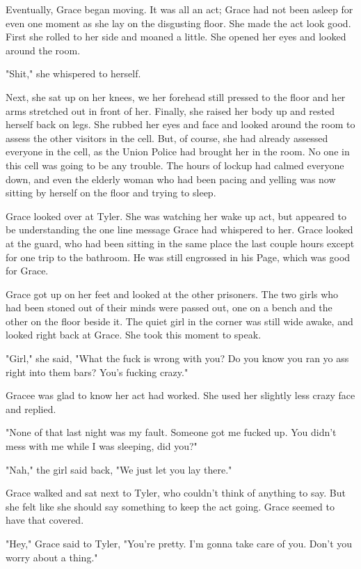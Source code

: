 \documentclass[courier]{sffms}
\begin{document}
Eventually, Grace began moving. It was all an act; Grace
had not been asleep for even one moment as she lay
on the disgusting floor. She made the act look good.
First she rolled to her side and moaned a little.
She opened her eyes and looked around the room.

"Shit," she whispered to herself.

Next, she sat up on her knees, we her forehead still pressed
to the floor and her arms stretched out in front of her.
Finally, she raised her body up and rested herself back on
legs. She rubbed her eyes and face and looked around the
room to assess the other visitors in the cell. But, of course,
she had already assessed everyone in the cell, as the Union
Police had brought her in the room. No one in this cell was
going to be any trouble. The hours of lockup had calmed
everyone down, and even the elderly woman who had been
pacing and yelling was now sitting by herself on the floor
and trying to sleep.

Grace looked over at Tyler. She was watching her wake up
act, but appeared to be understanding the one line message
Grace had whispered to her. Grace looked at the guard,
who had been sitting in the same place the last couple hours
except for one trip to the bathroom. He was still engrossed
in his Page, which was good for Grace.

Grace got up on her feet and looked at the other prisoners.
The two girls who had been stoned out of their minds were
passed out, one on a bench and the other on the floor beside
it. The quiet girl in the corner was still wide awake, and looked
right back at Grace. She took this moment to speak.

"Girl," she said, "What the fuck is wrong with you? Do you
know you ran yo ass right into them bars? You's fucking
crazy."

Gracee was glad to know her act had worked. She used her
slightly less crazy face and replied.

"None of that last night was my fault. Someone got me fucked
up. You didn't mess with me while I was sleeping, did you?"

"Nah," the girl said back, "We just let you lay there."

Grace walked and sat next to Tyler, who couldn't think of
anything to say. But she felt like she should say something
to keep the act going. Grace seemed to have that covered.

"Hey," Grace said to Tyler, "You're pretty. I'm gonna take care
of you. Don't you worry about a thing."
\end{document}
